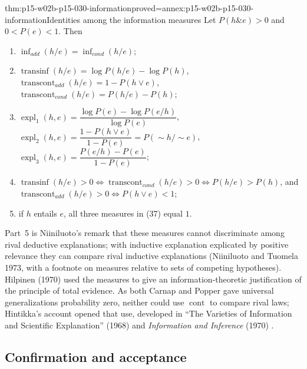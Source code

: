 \begin{hbtheorem}{thm:p15-w02b-p15-030-information}{proved=annex:p15-w02b-p15-030-information}{Identities among the information measures}
Let \(P(h\&e)>0\) and \(0<P(e)<1\). Then
\begin{enumerate}
\item \(\operatorname{inf}_{add}(h/e)=\operatorname{inf}_{cond}(h/e)\);
\item \(\operatorname{transinf}(h/e)=\log P(h/e)-\log P(h)\),
  \(\operatorname{transcont}_{add}(h/e)=1-P(h\lor e)\),
  \(\operatorname{transcont}_{cond}(h/e)=P(h/e)-P(h)\);
\item \(\operatorname{expl}_1(h,e)=\dfrac{\log P(e)-\log P(e/h)}{\log P(e)}\),
  \(\operatorname{expl}_2(h,e)=\dfrac{1-P(h\lor e)}{1-P(e)}=P(\sim h/\sim e)\),
  \(\operatorname{expl}_3(h,e)=\dfrac{P(e/h)-P(e)}{1-P(e)}\);
\item \(\operatorname{transinf}(h/e)>0\iff\operatorname{transcont}_{cond}(h/e)>0\iff P(h/e)>P(h)\),
  and \(\operatorname{transcont}_{add}(h/e)>0\iff P(h\lor e)<1\);
\item if \(h\) entails \(e\), all three measures in (37) equal \(1\).
\end{enumerate}
\end{hbtheorem}

Part~5 is Niiniluoto's remark that these measures cannot discriminate
among rival deductive explanations; with inductive explanation explicated
by positive relevance they can compare rival inductive explanations
(Niiniluoto and Tuomela 1973, with a footnote on measures relative to sets
of competing hypotheses). Hilpinen (1970) used the measures to give an
information-theoretic justification of the principle of total evidence.
As both Carnap and Popper gave universal generalizations probability
zero, neither could use \(\operatorname{cont}\) to compare rival laws;
Hintikka's account opened that use, developed in ``The Varieties of
Information and Scientific Explanation'' (1968) and \emph{Information and
Inference} (1970) \cite[pp.~330--331 and n.~7]{Niiniluoto2011HintikkaProgramReading}.

\subsection{Confirmation and acceptance}
\label{sec:p15-w02b-p15-030-nn-confirmation}

